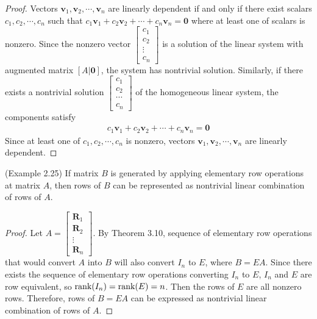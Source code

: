 \begin{proof}
	Vectors $\textbf{v}_1, \textbf{v}_2, \cdots, \textbf{v}_n$ are linearly dependent if and only if there exist scalars $c_1, c_2, \cdots, c_n$ such that $c_1\textbf{v}_1 + c_2\textbf{v}_2 + \cdots + c_n\textbf{v}_n = \textbf{0}$ where at least one of scalars is nonzero. Since the nonzero vector $\begin{bmatrix}
		c_1 \\ c_2 \\ \vdots \\ c_n
	\end{bmatrix}$ is a solution of the linear system with augmented matrix $[A|\textbf{0}]$, the system has nontrivial solution.
	Similarly, if there exists a nontrivial solution $\begin{bmatrix}
		c_1 \\ c_2 \\ \cdots \\ c_n
	\end{bmatrix}$ of the homogeneous linear system, the components satisfy
	\begin{align*}
		c_1\textbf{v}_1 + c_2\textbf{v}_2 + \cdots + c_n\textbf{v}_n = \textbf{0}
	\end{align*} Since at least one of $c_1, c_2, \cdots, c_n$ is nonzero, vectors $\textbf{v}_1, \textbf{v}_2, \cdots, \textbf{v}_n$ are linearly dependent.
\end{proof}

\begin{plaintheorem}
	(Example 2.25) If matrix $B$ is generated by applying elementary row operations at matrix $A$, then rows of $B$ can be represented as nontrivial linear combination of rows of $A$.
\end{plaintheorem}

\begin{proof}
	Let $A = \begin{bmatrix}
		\textbf{R}_1 \\ \textbf{R}_2 \\ \vdots \\ \textbf{R}_n
	\end{bmatrix}$. By Theorem 3.10, sequence of elementary row operations that would convert $A$ into $B$ will also convert $I_n$ to $E$, where $B = EA$. Since there exists the sequence of elementary row operations converting $I_n$ to $E$, $I_n$ and $E$ are row equivalent, so $\textnormal{rank}(I_n) = \textnormal{rank}(E) = n$. Then the rows of $E$ are all nonzero rows. Therefore, rows of $B = EA$ can be expressed as nontrivial linear combination of rows of $A$.
\end{proof}

